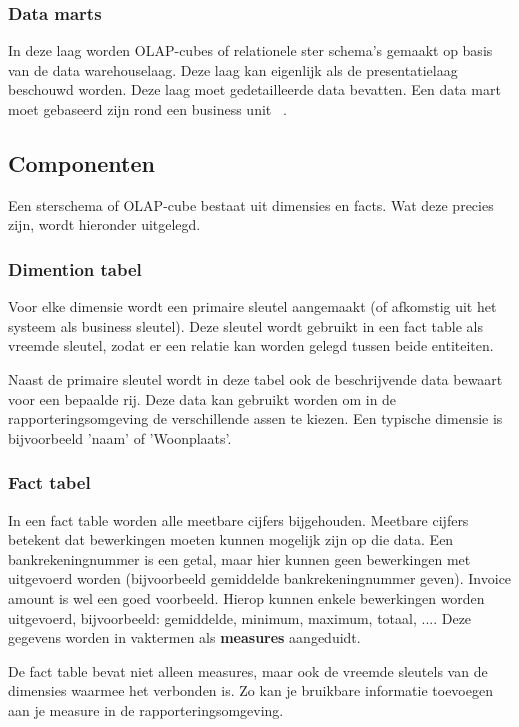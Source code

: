 \subsubsection{Data marts}
In deze laag worden OLAP-cubes of relationele ster schema's gemaakt op basis van de data warehouselaag. Deze laag kan eigenlijk als de presentatielaag beschouwd worden. Deze laag moet gedetailleerde data bevatten. Een data mart moet gebaseerd zijn rond een business unit ~\autocite{Kimball2013}.

\subsection{Componenten}
Een sterschema of OLAP-cube bestaat uit dimensies en facts. Wat deze precies zijn, wordt hieronder uitgelegd. 

\subsubsection{Dimention tabel}
Voor elke dimensie wordt een primaire sleutel aangemaakt (of afkomstig uit het systeem als business sleutel). Deze sleutel wordt gebruikt in een fact table als vreemde sleutel, zodat er een relatie kan worden gelegd tussen beide entiteiten.

Naast de primaire sleutel wordt in deze tabel ook de beschrijvende data bewaart voor een bepaalde rij. Deze data kan gebruikt worden om in de rapporteringsomgeving de verschillende assen te kiezen. Een typische dimensie is bijvoorbeeld 'naam' of 'Woonplaats'.

\subsubsection{Fact tabel}
In een fact table worden alle meetbare cijfers bijgehouden. Meetbare cijfers betekent dat bewerkingen moeten kunnen mogelijk zijn op die data. Een bankrekeningnummer is een getal, maar hier kunnen geen bewerkingen met uitgevoerd worden (bijvoorbeeld gemiddelde bankrekeningnummer geven). Invoice amount is wel een goed voorbeeld. Hierop kunnen enkele bewerkingen worden uitgevoerd, bijvoorbeeld: gemiddelde, minimum, maximum, totaal, .... Deze gegevens worden in vaktermen als \textbf{measures} aangeduidt. 

De fact table bevat niet alleen measures, maar ook de vreemde sleutels van de dimensies waarmee het verbonden is. Zo kan je bruikbare informatie toevoegen aan je measure in de rapporteringsomgeving.

